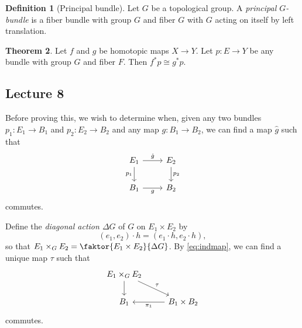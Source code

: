 \documentclass[10pt,letterpaper,cm]{nupset}
\theoremstyle{definition}
\newtheorem{defn}{Definition}[subsection]
\theoremstyle{theorem}
\newtheorem{theorem}[defn]{Theorem}
\theoremstyle{remark}
\newcommand{\1}{\mathbb{1}}
\newcommand{\0}{\vec 0}
\begin{document}
\begin{defn}[Principal bundle]
Let $G$ be a topological group. A \textit{principal $G$-bundle} is a fiber bundle with group $G$ and fiber $G$ with $G$ acting on itself by left translation.
\end{defn} 


\begin{theorem}\label{class}
Let $f$ and $g$ be homotopic maps $X \to Y$. Let $p: E \to Y$ be any bundle with group $G$ and fiber $F$. Then $f^{\ast}{p} \cong g^{\ast}{p}$.
\end{theorem}



\subsection{Lecture 8}

Before proving this, we wish to determine when, given any two bundles $p_1 : E_1 \to B_1$ and $p_2 : E_2 \to B_2$ and any map $g: B_1 \to B_2$, we can find a map $\hat{g}$ such that  
\[
\begin{tikzcd}
E_1 \arrow[d, "p_1"'] \arrow[r, "\hat{g}"] & E_2 \arrow[d, "p_2"] \\
B_1 \arrow[r, "g"']                        & B_2                 
\end{tikzcd}
\] commutes.

Define the \textit{diagonal action $\Delta{G}$} of $G$ on $E_1 \times E_2$ by $$\left(e_1, e_2\right)\cdot h = \left(e_1\cdot h, e_2 \cdot h\right),$$ so that $E_1 \times_G E_2 = \faktor{E_1 \times E_2}{\Delta{G}}$. By \eqref{eq:indmap}, we can find a unique map $\tau$ such that
\[
\begin{tikzcd}
E_1\times_G E_2 \arrow[rd, "\tau"] \arrow[d] &                                  \\
B_1                                          & B_1\times B_2 \arrow[l, "\pi_1"]
\end{tikzcd}
\] commutes.
\end{document}
